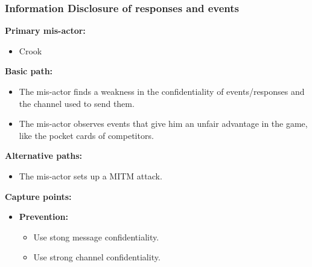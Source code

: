\documentclass[a4paper,11pt]{report}
\begin{document}
\subsubsection{Information Disclosure of responses and events}
\label{PlayerFlowCasesI4}
\textbf{Primary mis-actor:}
\begin{itemize}
\item Crook
\end{itemize}
\textbf{Basic path:}
\begin{itemize}
\item The mis-actor finds a weakness in the confidentiality of events/responses and the channel used to send them.
\item The mis-actor observes events that give him an unfair advantage in the game, like the pocket cards of competitors.
\end{itemize}
\textbf{Alternative paths:}
\begin{itemize}
\item The mis-actor sets up a MITM attack.
\end{itemize}
\textbf{Capture points:}
\begin{itemize}
\item \textbf{Prevention:}
\begin{itemize}
\item Use stong message confidentiality.
\item Use strong channel confidentiality.
\end{itemize}
\end{itemize}
\end{document}
